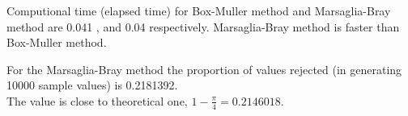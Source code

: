 \documentclass[11pt]{article}
\begin{document}
Computional time (elapsed time) for Box-Muller method and Marsaglia-Bray method are  0.041 , and  0.04 respectively.
Marsaglia-Bray method is faster than Box-Muller method.

For the Marsaglia-Bray method the proportion of values rejected (in generating 10000 sample values) is  0.2181392.\\
The value is close to theoretical one, $1-\frac{\pi}{4} = 0.2146018$.
\end{document}
